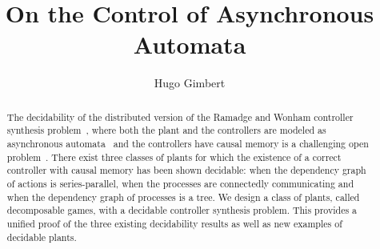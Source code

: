 \documentclass[a4paper,UKenglish]{lipics-v2016}
\begin{document}


\title{On the Control of Asynchronous Automata}

\iffalse
\author{Hugo Gimbert\\
LaBRI, CNRS, Universit\'e de Bordeaux, France\\ \tt{hugo.gimbert@cnrs.fr}}

\fi



\iftrue
{} 

\author[1]{Hugo Gimbert}





\EventLogo{}

\fi


\maketitle

\begin{abstract}
The decidability of the distributed version of the Ramadge and Wonham controller synthesis problem~\cite{ramadge1989control},
where both the plant and the controllers are modeled as asynchronous automata~\cite{zautomata,thebook}
and the controllers have causal memory
is a challenging open problem~\cite{alook,mumu}.
There exist three classes of plants for which the existence of a correct controller with causal memory has been shown decidable: when the dependency graph of actions is series-parallel, 
when the processes are connectedly communicating and when the dependency graph of processes is a tree. 
We design a class of plants, called decomposable games, 
with a decidable controller synthesis problem.
This provides
 a unified proof of the three existing decidability results
 as well as new examples of decidable plants.
 \end{abstract}
\end{document}
